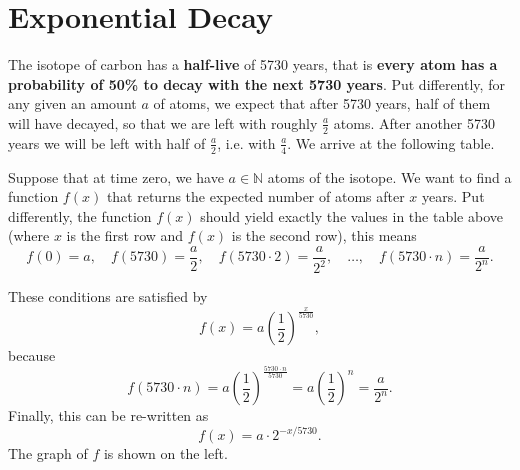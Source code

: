 \section*{Exponential Decay}
The  isotope of carbon has a \textbf{half-live} of 5730 years, that is \textbf{every  atom has a probability of 50\% to decay with the next 5730 years}.
Put differently, for any given an amount $a$ of  atoms, we expect that after 5730 years, half of them will have decayed, so that we are left with roughly $\frac{a}{2}$ atoms.
After another 5730 years we will be left with half of $\frac{a}{2}$, i.e. with $\frac{a}{4}$.
We arrive at the following table.
\begin{figure}[ht]
	\centering
\end{figure}
Suppose that at time zero, we have $a\in\mathbb N$ atoms of the  isotope.
We want to find a function $f\left(x\right)$ that returns the expected number of  atoms after $x$ years.
Put differently, the function $f\left(x\right)$ should yield exactly the values in the table above (where $x$ is the first row and $f\left(x\right)$ is the second row), this means
\begin{equation*}
	f\left(0\right)=a,\quad
	f\left(5730\right)=\frac{a}{2},\quad
	f\left(5730\cdot 2\right)=\frac{a}{2^2},\quad\ldots,\quad
	f\left(5730\cdot n\right)=\frac{a}{2^n}.
\end{equation*}
\begin{minipage}{0.48\textwidth}
	These conditions are satisfied by
	\begin{equation*}
		f\left(x\right)=a\left(\frac{1}{2}\right)^{\tfrac{x}{5730}},
	\end{equation*}
	because
	\begin{equation*}
		f\left(5730\cdot n\right)=a\left(\frac{1}{2}\right)^{\tfrac{5730\cdot n}{5730}}
		=a\left(\frac{1}{2}\right)^n
		=\frac{a}{2^n}.
	\end{equation*}
	Finally, this can be re-written as
	\begin{equation*}
		f\left(x\right)=a\cdot 2^{-x/5730}.
	\end{equation*}
	The graph of $f$ is shown on the left.
\end{minipage}\hfill
